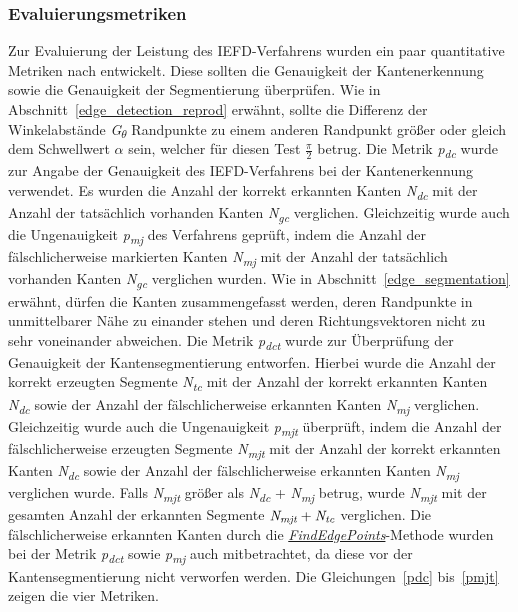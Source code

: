 \subsubsection{Evaluierungsmetriken} \label{evaluations_metrics}
Zur Evaluierung der Leistung des IEFD-Verfahrens wurden ein paar quantitative Metriken nach \textcite[10]{ni_edge_2016} entwickelt. Diese sollten die Genauigkeit der Kantenerkennung sowie die Genauigkeit der Segmentierung überprüfen. Wie in Abschnitt~\ref{edge_detection_reprod} erwähnt, sollte die Differenz der Winkelabstände \textit{G\textsubscript{$\theta$}} Randpunkte zu einem anderen Randpunkt größer oder gleich dem Schwellwert $\alpha$ sein, welcher für diesen Test $\frac{\pi}{2}$ betrug. Die Metrik \textit{p\textsubscript{dc}} wurde zur Angabe der Genauigkeit des IEFD-Verfahrens bei der Kantenerkennung verwendet. Es wurden die Anzahl der korrekt erkannten Kanten \textit{N\textsubscript{dc}} mit der Anzahl der tatsächlich vorhanden Kanten \textit{N\textsubscript{gc}} verglichen. Gleichzeitig wurde auch die Ungenauigkeit \textit{p\textsubscript{mj}} des Verfahrens geprüft, indem die Anzahl der fälschlicherweise markierten Kanten \textit{N\textsubscript{mj}} mit der Anzahl der tatsächlich vorhanden Kanten \textit{N\textsubscript{gc}} verglichen wurden. Wie in Abschnitt~\ref{edge_segmentation} erwähnt, dürfen die Kanten zusammengefasst werden, deren Randpunkte in unmittelbarer Nähe zu einander stehen und deren Richtungsvektoren nicht zu sehr voneinander abweichen. Die Metrik \textit{p\textsubscript{dct}} wurde zur Überprüfung der Genauigkeit der Kantensegmentierung entworfen. Hierbei wurde die Anzahl der korrekt erzeugten Segmente \textit{N\textsubscript{tc}} mit der Anzahl der korrekt erkannten Kanten \textit{N\textsubscript{dc}} sowie der Anzahl der fälschlicherweise erkannten Kanten \textit{N\textsubscript{mj}} verglichen. Gleichzeitig wurde auch die Ungenauigkeit \textit{p\textsubscript{mjt}} überprüft, indem die Anzahl der fälschlicherweise erzeugten Segmente \textit{N\textsubscript{mjt}} mit der Anzahl der korrekt erkannten Kanten \textit{N\textsubscript{dc}} sowie der Anzahl der fälschlicherweise erkannten Kanten \textit{N\textsubscript{mj}} verglichen wurde. Falls \textit{N\textsubscript{mjt}} größer als \textit{N\textsubscript{dc}} + \textit{N\textsubscript{mj}} betrug, wurde \textit{N\textsubscript{mjt}} mit der gesamten Anzahl der erkannten Segmente $\textit{N\textsubscript{mjt}} + \textit{N\textsubscript{tc}}$ verglichen. Die fälschlicherweise erkannten Kanten durch die \textit{\hyperref[alg:find_edge_points]{FindEdgePoints}}-Methode wurden bei der Metrik \textit{p\textsubscript{dct}} sowie \textit{p\textsubscript{mj}} auch mitbetrachtet, da diese vor der Kantensegmentierung nicht verworfen werden. Die Gleichungen~\ref{pdc} bis~\ref{pmjt} zeigen die vier Metriken.

